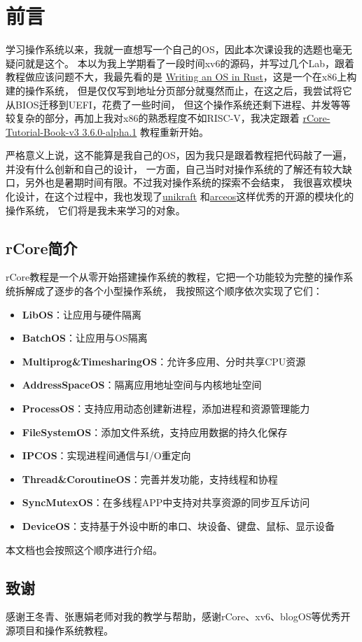 \chapter*{前言}

学习操作系统以来，我就一直想写一个自己的OS，因此本次课设我的选题也毫无疑问就是这个。
本以为我上学期看了一段时间xv6的源码，并写过几个Lab，跟着教程做应该问题不大，我最先看的是
\href{https://os.phil-opp.com/}{Writing an OS in Rust}，这是一个在x86上构建的操作系统，
但是仅仅写到地址分页部分就戛然而止，在这之后，我尝试将它从BIOS迁移到UEFI，花费了一些时间，
但这个操作系统还剩下进程、并发等等较复杂的部分，再加上我对x86的熟悉程度不如RISC-V，我决定跟着
\href{https://rcore-os.cn/rCore-Tutorial-Book-v3/index.html}{rCore-Tutorial-Book-v3 3.6.0-alpha.1}
教程重新开始。

严格意义上说，这不能算是我自己的OS，因为我只是跟着教程把代码敲了一遍，并没有什么创新和自己的设计，
一方面，自己当时对操作系统的了解还有较大缺口，另外也是暑期时间有限。不过我对操作系统的探索不会结束，
我很喜欢模块化设计，在这个过程中，我也发现了\href{https://github.com/unikraft/unikraft}{unikraft}
和\href{https://github.com/arceos-org/arceos}{arceos}这样优秀的开源的模块化的操作系统，
它们将是我未来学习的对象。

\section*{rCore简介}

rCore教程是一个从零开始搭建操作系统的教程，它把一个功能较为完整的操作系统拆解成了逐步的各个小型操作系统，
我按照这个顺序依次实现了它们：

\begin{itemize}
    \item \textbf{LibOS}：让应用与硬件隔离
    \item \textbf{BatchOS}：让应用与OS隔离
    \item \textbf{Multiprog\&TimesharingOS}：允许多应用、分时共享CPU资源
    \item \textbf{AddressSpaceOS}：隔离应用地址空间与内核地址空间
    \item \textbf{ProcessOS}：支持应用动态创建新进程，添加进程和资源管理能力
    \item \textbf{FileSystemOS}：添加文件系统，支持应用数据的持久化保存
    \item \textbf{IPCOS}：实现进程间通信与I/O重定向
    \item \textbf{Thread\&CoroutineOS}：完善并发功能，支持线程和协程
    \item \textbf{SyncMutexOS}：在多线程APP中支持对共享资源的同步互斥访问
    \item \textbf{DeviceOS}：支持基于外设中断的串口、块设备、键盘、鼠标、显示设备    
\end{itemize}

本文档也会按照这个顺序进行介绍。

\section*{致谢}

感谢王冬青、张惠娟老师对我的教学与帮助，感谢rCore、xv6、blogOS等优秀开源项目和操作系统教程。